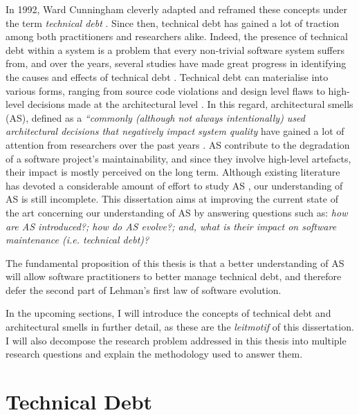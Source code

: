 In 1992, Ward Cunningham cleverly adapted and reframed these concepts under the term \emph{technical debt} \cite{Cunningham1992}. %
Since then, technical debt has gained a lot of traction among both practitioners and researchers alike.
Indeed, the presence of technical debt within a system is a problem that every non-trivial software system suffers from, and over the years, several studies have made great progress in identifying the causes and effects of technical debt \cite{Brown2010,Kruchten2012,Lehman1979}.
Technical debt can materialise into various forms, ranging from source code violations \cite{Letouzey2012,Curtis2012} and design level flaws \cite{Marinescu2012} to high-level decisions made at the architectural level \cite{Ernst2015,Yli-Huumo2014}.
In this regard, architectural smells (AS), defined as a \emph{``commonly (although not always intentionally) used architectural decisions that negatively impact system quality} \cite{Garcia2009} have gained a lot of attention from researchers over the past years \cite{Verdecchia2018}.
AS contribute to the degradation of a software project's maintainability, and since they involve high-level artefacts, their impact is mostly perceived on the long term. 
Although existing literature has devoted a considerable amount of effort to study AS \cite{Mo2015,Le2016,Arcelli2016}, our understanding of AS is still incomplete.
This dissertation aims at improving the current state of the art concerning our understanding of AS by answering questions such as: \emph{how are AS introduced?; how do AS evolve?; and, what is their impact on software maintenance (i.e. technical debt)?}

The fundamental proposition of this thesis is that a better understanding of AS will allow software practitioners to better manage technical debt, and therefore defer the second part of Lehman's first law of software evolution.

In the upcoming sections, I will introduce the concepts of technical debt and architectural smells in further detail, as these are the \emph{leitmotif} of this dissertation.
I will also decompose the research problem addressed in this thesis into multiple research questions and explain the methodology used to answer them.


\section{Technical Debt}
